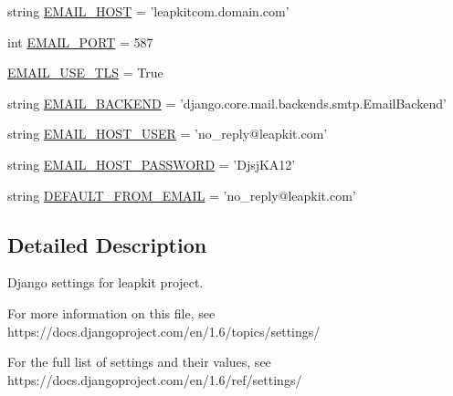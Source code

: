 \begin{DoxyCompactItemize}
\item 
string \hyperlink{namespaceleapkit_1_1settings_1_1base__settings__local_ab64709d2d9e59a62ad755808776f4d6f}{E\-M\-A\-I\-L\-\_\-\-H\-O\-S\-T} = 'leapkitcom.\-domain.\-com'
\item 
int \hyperlink{namespaceleapkit_1_1settings_1_1base__settings__local_af5af6665e20a2980c5693982308d00e4}{E\-M\-A\-I\-L\-\_\-\-P\-O\-R\-T} = 587
\item 
\hyperlink{namespaceleapkit_1_1settings_1_1base__settings__local_a6ebdbe33092855fd9a9b0eeaeca71762}{E\-M\-A\-I\-L\-\_\-\-U\-S\-E\-\_\-\-T\-L\-S} = True
\item 
string \hyperlink{namespaceleapkit_1_1settings_1_1base__settings__local_a7359d39a05810024a7711253f8e26a76}{E\-M\-A\-I\-L\-\_\-\-B\-A\-C\-K\-E\-N\-D} = 'django.\-core.\-mail.\-backends.\-smtp.\-Email\-Backend'
\item 
string \hyperlink{namespaceleapkit_1_1settings_1_1base__settings__local_a4b0a3037679545c73798deac22c3279f}{E\-M\-A\-I\-L\-\_\-\-H\-O\-S\-T\-\_\-\-U\-S\-E\-R} = 'no\-\_\-reply@leapkit.\-com'
\item 
string \hyperlink{namespaceleapkit_1_1settings_1_1base__settings__local_ab571ca9fffb550571c02eefe9ff45a8d}{E\-M\-A\-I\-L\-\_\-\-H\-O\-S\-T\-\_\-\-P\-A\-S\-S\-W\-O\-R\-D} = 'Djsj\-K\-A12'
\item 
string \hyperlink{namespaceleapkit_1_1settings_1_1base__settings__local_a08292d0e15de483fae193d8bbcb0a077}{D\-E\-F\-A\-U\-L\-T\-\_\-\-F\-R\-O\-M\-\_\-\-E\-M\-A\-I\-L} = 'no\-\_\-reply@leapkit.\-com'
\end{DoxyCompactItemize}


\subsection{Detailed Description}
\begin{DoxyVerb}Django settings for leapkit project.

For more information on this file, see
https://docs.djangoproject.com/en/1.6/topics/settings/

For the full list of settings and their values, see
https://docs.djangoproject.com/en/1.6/ref/settings/
\end{DoxyVerb}
 

